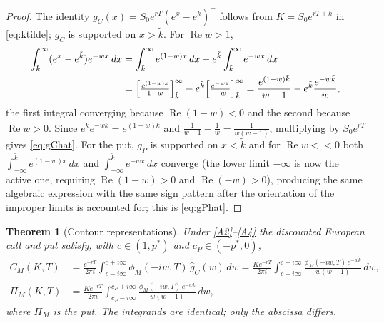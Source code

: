 \documentclass[11pt]{article}
\newtheorem{theorem}{Theorem}[section]
\DeclareMathOperator{\Real}{Re}
\begin{document}
\begin{proof}
The identity $g_C(x)=S_0e^{rT}(e^x-e^{\tilde k})^{+}$ follows from
$K=S_0e^{rT+\tilde k}$ in \eqref{eq:ktilde}; $g_C$ is supported on
$x>\tilde k$. For $\Real w>1$,
\begin{align}
\int_{\tilde k}^\infty(e^x-e^{\tilde k})e^{-wx}\,dx
&=\int_{\tilde k}^\infty e^{(1-w)x}\,dx
-e^{\tilde k}\int_{\tilde k}^\infty e^{-wx}\,dx\notag\\
&=\Bigl[\tfrac{e^{(1-w)x}}{1-w}\Bigr]_{\tilde k}^\infty
-e^{\tilde k}\Bigl[\tfrac{e^{-wx}}{-w}\Bigr]_{\tilde k}^\infty
=\frac{e^{(1-w)\tilde k}}{w-1}-e^{\tilde k}\frac{e^{-w\tilde k}}{w},
\label{eq:gC-pf}
\end{align}
the first integral converging because $\Real(1-w)<0$ and the second because
$\Real w>0$. Since $e^{\tilde k}e^{-w\tilde k}=e^{(1-w)\tilde k}$ and
$\tfrac1{w-1}-\tfrac1w=\tfrac1{w(w-1)}$, multiplying by $S_0e^{rT}$ gives
\eqref{eq:gChat}. For the put, $g_P$ is supported on $x<\tilde k$ and for
$\Real w<<0$ both $\int_{-\infty}^{\tilde k}e^{(1-w)x}\,dx$ and
$\int_{-\infty}^{\tilde k}e^{-wx}\,dx$ converge (the lower limit $-\infty$
is now the active one, requiring $\Real(1-w)>0$ and $\Real(-w)>0$),
producing the same algebraic expression with the same sign pattern after the
orientation of the improper limits is accounted for; this is
\eqref{eq:gPhat}.
\end{proof}

\begin{theorem}[Contour representations]\label{thm:contour}
Under \ref{A2}--\ref{A4} the discounted European call and put satisfy, with
$c\in(1,p^*)$ and $c_P\in(-p^*,0)$,
\begin{align}
C_M(K,T)&=\frac{e^{-rT}}{2\pi i}\int_{c-i\infty}^{c+i\infty}
\phi_M(-iw,T)\,\hat g_C(w)\,dw
=\frac{K e^{-rT}}{2\pi i}\int_{c-i\infty}^{c+i\infty}
\frac{\phi_M(-iw,T)\,e^{-w\tilde k}}{w(w-1)}\,dw,
\label{eq:contour-call}\\
\Pi_M(K,T)&=\frac{K e^{-rT}}{2\pi i}\int_{c_P-i\infty}^{c_P+i\infty}
\frac{\phi_M(-iw,T)\,e^{-w\tilde k}}{w(w-1)}\,dw,
\label{eq:contour-put}
\end{align}
where $\Pi_M$ is the put. The integrands are identical; only the abscissa
differs.
\end{theorem}
\end{document}
